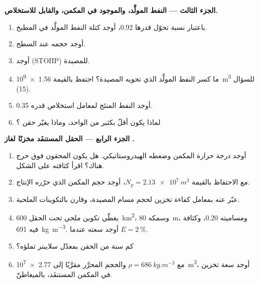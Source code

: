 \begin{problem}
\noindent\textbf{الجزء الثالث --- النفط المولَّد، والموجود في المكمن، والقابل للاستخلاص.}
\begin{enumerate}[resume]
  \item باعتبار نسبة تحوّل قدرها 0.92، أوجد كتلة النفط المولَّد في المطبخ.
  \item أوجد حجمه عند السطح.
  \item أوجد  (STOIIP) للمصيدة.
  \item ما كسر النفط المولَّد الذي تحويه المصيدة؟ احتفظ بالقيمة \qty{1.56e9}{m^3} للسؤال (15).
  \item أوجد النفط المنتَج لمعامل استخلاص قدره 0.35.
  \item لماذا يكون  أقلّ بكثير من الواحد، وماذا يغيّر حقن ؟
\end{enumerate}

\noindent\textbf{الجزء الرابع --- الحقل المستنفَد مخزنًا لغاز .}
\begin{enumerate}[resume]
  \item أوجد درجة حرارة المكمن وضغطه الهيدروستاتيكي. هل يكون  المحقون
        فوق حرج هناك؟ اقرأ كثافته على الشكل.
  \item مع الاحتفاظ بالقيمة $N_p = \qty{2.13e7}{m^3}$، أوجد حجم المكمن الذي حرّره الإنتاج.
  \item عبّر عنه بمعامل كفاءة تخزين لحجم مسام المصيدة، وقارن
        بالتكوينات الملحية.
  \item يغطّي تكوين ملحي تحت الحقل \qty{600}{km^2}، وسمكه \qty{80}{m}،
        ومساميته 0.20، وكثافة  فيه \qty{691}{kg.m^{-3}}. أوجد سعته عندما $E =
        \qty{2}{\percent}$.
  \item كم سنة من الحقن بمعدّل سلايبنر تملؤه؟
  \item مع $\rho = \qty{686}{kg.m^{-3}}$ والحجم المحرَّر مقرَّبًا إلى \qty{2.77e7}{m^3}، أوجد
        سعة تخزين  في المكمن المستنفَد، بالميغاطنّ.
\end{enumerate}
\end{problem}
